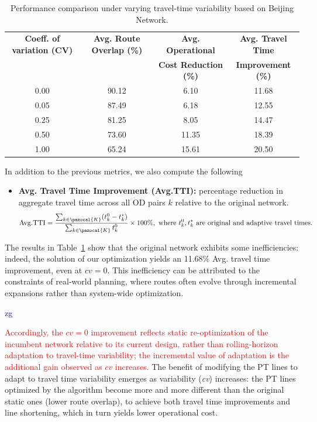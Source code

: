 \documentclass[a4paper,fleqn]{cas-sc}
\newcommand{\stkout}[1]{\ifmmode\text{\sout{\ensuremath{#1}}}\else\sout{#1}\fi}
\newcommand\rev[3]{\textcolor{blue}{\begin{scriptsize}{#1}\end{scriptsize}\stkout{#2}}\textcolor{red}{#3}}
\newcommand\rev[3]{\ignorespaces#3\ignorespaces\unskip}
\begin{document}
\begin{table}[t]
\centering
\small
\begin{threeparttable}
    \setlength{\tabcolsep}{12pt} 
    \renewcommand{\arraystretch}{1.25}

    \begin{tabular}{c c c c}
    \toprule
    \textbf{Coeff. of variation (CV)} & \textbf{Avg. Route Overlap (\%)} & \textbf{Avg. Operational} & \textbf{Avg. Travel Time } 
    \\
    && \textbf{Cost Reduction (\%)} & \textbf{Improvement (\%)}
    \\
    \midrule
    0.00 & 90.12 & 6.10  & 11.68  \\
    0.05 & 87.49 & 6.18  & 12.55  \\
    0.25 & 81.25 & 8.05  & 14.47 \\
    0.50 & 73.60 & 11.35 & 18.39  \\
    1.00 & 65.24 & 15.61 & 20.50 \\
    \bottomrule
    \end{tabular}
    
\end{threeparttable}
\caption{Performance comparison under varying travel-time variability based on Beijing Network.}
\label{tab:routes_comparison}
\end{table}

In addition to the previous metrics, we also compute the following
\begin{itemize}
    \item \textbf{Avg. Travel Time Improvement (Avg.TTI):} percentage reduction in aggregate travel time across all OD pairs $k$ relative to the original network.
    \begin{align}
        \mathrm{Avg. TTI} = \frac{\sum_{k \in \pazocal{K}} (t_k^0 - t_k^*)}{\sum_{k \in \pazocal{K}} t_k^0} \times 100\%, \text{ where } t_k^0, t_k^* \text{ are original and adaptive travel times.}
    \end{align}
\end{itemize}
%
The results in Table~\ref{tab:routes_comparison} show that the original network exhibits some inefficiencies: indeed, the solution of our optimization yields an 11.68\% Avg. travel time improvement, even at $cv = 0$. This inefficiency can be attributed to the constraints of real-world planning, where routes often evolve through incremental expansions rather than system-wide optimization.\rev{zg}{}{ Accordingly, the $cv=0$ improvement reflects static re-optimization of the incumbent network relative to its current design, rather than rolling-horizon adaptation to travel-time variability; the incremental value of adaptation is the additional gain observed as $cv$ increases.}
%
The benefit of modifying the PT lines to adapt to travel time variability emerges as variability (\textit{cv}) increases: the PT lines optimized by the algorithm become more and more different than the original static ones (lower route overlap), to achieve both travel time improvements and line shortening, which in turn yields lower operational cost.
\end{document}
